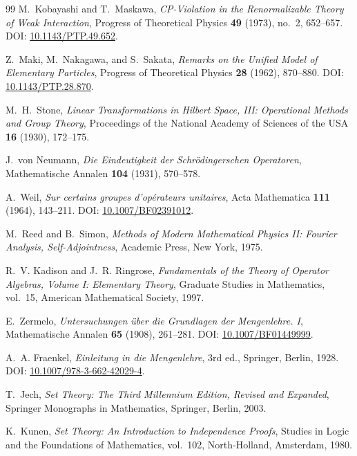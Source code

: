 \documentclass[12pt,a4paper]{article}
\begin{document}
\begin{thebibliography}{99}
M.~Kobayashi and T.~Maskawa,
\emph{CP-Violation in the Renormalizable Theory of Weak Interaction},
Progress of Theoretical Physics \textbf{49} (1973), no.~2, 652--657.
\newblock DOI: \href{https://doi.org/10.1143/PTP.49.652}{10.1143/PTP.49.652}.

Z.~Maki, M.~Nakagawa, and S.~Sakata,
\emph{Remarks on the Unified Model of Elementary Particles},
Progress of Theoretical Physics \textbf{28} (1962), 870--880.
\newblock DOI: \href{https://doi.org/10.1143/PTP.28.870}{10.1143/PTP.28.870}.

M.~H.~Stone,
\emph{Linear Transformations in Hilbert Space, III: Operational Methods and Group Theory},
Proceedings of the National Academy of Sciences of the USA \textbf{16} (1930), 172--175.

J.~von Neumann,
\emph{Die Eindeutigkeit der Schr\"odingerschen Operatoren},
Mathematische Annalen \textbf{104} (1931), 570--578.

A.~Weil,
\emph{Sur certains groupes d'op\'erateurs unitaires},
Acta Mathematica \textbf{111} (1964), 143--211.
\newblock DOI: \href{https://doi.org/10.1007/BF02391012}{10.1007/BF02391012}.

M.~Reed and B.~Simon,
\emph{Methods of Modern Mathematical Physics II: Fourier Analysis, Self-Adjointness},
Academic Press, New York, 1975.

R.~V. Kadison and J.~R. Ringrose,
\emph{Fundamentals of the Theory of Operator Algebras, Volume I: Elementary Theory},
Graduate Studies in Mathematics, vol.~15,
American Mathematical Society, 1997.

E.~Zermelo,
\emph{Untersuchungen \"uber die Grundlagen der Mengenlehre. I},
Mathematische Annalen \textbf{65} (1908), 261--281.
\newblock DOI: \href{https://doi.org/10.1007/BF01449999}{10.1007/BF01449999}.

A.~A. Fraenkel,
\emph{Einleitung in die Mengenlehre},
3rd ed., Springer, Berlin, 1928.
\newblock DOI: \href{https://doi.org/10.1007/978-3-662-42029-4}{10.1007/978-3-662-42029-4}.

T.~Jech,
\emph{Set Theory: The Third Millennium Edition, Revised and Expanded},
Springer Monographs in Mathematics,
Springer, Berlin, 2003.

K.~Kunen,
\emph{Set Theory: An Introduction to Independence Proofs},
Studies in Logic and the Foundations of Mathematics, vol.~102,
North-Holland, Amsterdam, 1980.


\end{thebibliography}
\end{document}
